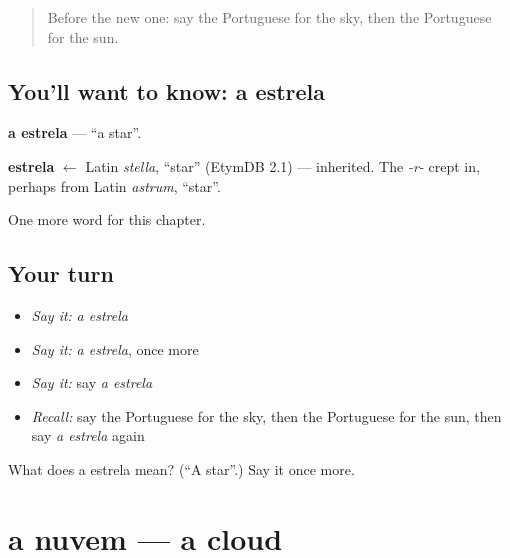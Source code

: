 \label{lesson:PT-C58-estrela}



\begin{quote}
Before the new one: say the Portuguese for the sky, then the Portuguese for the sun.
\end{quote}

\subsection*{You'll want to know: a estrela}
\textbf{a estrela} — \textquotedblleft{}a star\textquotedblright{}.

\begin{cousinweb}
\textbf{estrela} $\leftarrow$ Latin \emph{stella}, \textquotedblleft{}star\textquotedblright{} (EtymDB 2.1) — inherited. The \emph{-r-} crept in, perhaps from Latin \emph{astrum}, \textquotedblleft{}star\textquotedblright{}.
\end{cousinweb}

\begin{grammarlens}[title={What you've built}]
One more word for this chapter.
\end{grammarlens}

\subsection*{Your turn}
\begin{itemize}
\raggedright
  \item \emph{Say it:} \emph{a estrela}
  \item \emph{Say it:} \emph{a estrela}, once more
  \item \emph{Say it:} say \emph{a estrela}
  \item \emph{Recall:} say the Portuguese for the sky, then the Portuguese for the sun, then say \emph{a estrela} again
\end{itemize}

\begin{tcolorbox}[breakable,colback=teal!4,colframe=teal!35!black,title={Before you move on}]
What does a estrela mean? (\textquotedblleft{}A star\textquotedblright{}.) Say it once more.
\end{tcolorbox}
\section[a nuvem]{a nuvem — a cloud}

\label{lesson:PT-C58-nuvem}



